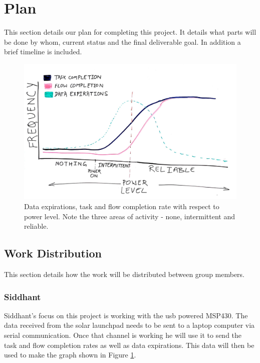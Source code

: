 \section{Plan} %
\label{sec:plan}

This section details our plan for completing this project.
It details what parts will be done by whom, current status and the final deliverable goal.
In addition a brief timeline is included.

\begin{figure}[!ht] %
\centering
\includegraphics[width=1.0\linewidth]{Figures/graph.jpeg}
\caption{
 Data expirations, task and flow completion rate with respect to power level.
 Note the three areas of activity - none, intermittent and reliable.
}
\label{f:graph}
\end{figure}



\subsection{Work Distribution}

This section details how the work will be distributed between group members.

\subsubsection{Siddhant}
Siddhant's focus on this project is working with the usb powered MSP430.
The data received from the solar launchpad needs to be sent to a laptop computer via serial communication.
Once that channel is working he will use it to send the task and flow completion rates as well as data expirations.
This data will then be used to make the graph shown in Figure \ref{f:graph}.

